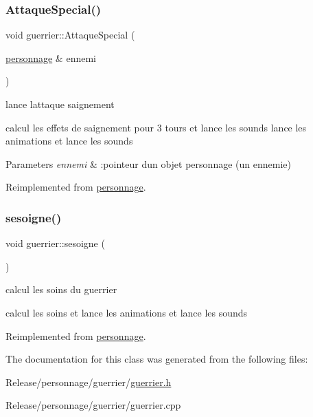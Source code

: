 \subsubsection{\texorpdfstring{Attaque\+Special()}{AttaqueSpecial()}}
{\footnotesize\ttfamily void guerrier\+::\+Attaque\+Special (\begin{DoxyParamCaption}\item[{\mbox{\hyperlink{classpersonnage}{personnage}} \&}]{ennemi }\end{DoxyParamCaption})\hspace{0.3cm}{\ttfamily [virtual]}}



lance l\textquotesingle{}attaque saignement 

calcul les effets de saignement pour 3 tours et lance les sounds lance les animations et lance les sounds


\begin{DoxyParams}{Parameters}
{\em ennemi} & \+:pointeur d\textquotesingle{}un objet personnage (un ennemie) \\
\hline
\end{DoxyParams}


Reimplemented from \mbox{\hyperlink{classpersonnage_ab8f27aff95ffc033fb22d56e549bd415}{personnage}}.

\mbox{\label{classguerrier_a6cd3c97454ef720925fcb7415739cd88}} 
\subsubsection{\texorpdfstring{sesoigne()}{sesoigne()}}
{\footnotesize\ttfamily void guerrier\+::sesoigne (\begin{DoxyParamCaption}{ }\end{DoxyParamCaption})\hspace{0.3cm}{\ttfamily [virtual]}}



calcul les soins du guerrier 

calcul les soins et lance les animations et lance les sounds 

Reimplemented from \mbox{\hyperlink{classpersonnage_a53539db23cbf909d2c4b025ff2ac2e45}{personnage}}.



The documentation for this class was generated from the following files\+:\begin{DoxyCompactItemize}
\item 
Release/personnage/guerrier/\mbox{\hyperlink{guerrier_8h}{guerrier.\+h}}\item 
Release/personnage/guerrier/guerrier.\+cpp\end{DoxyCompactItemize}
